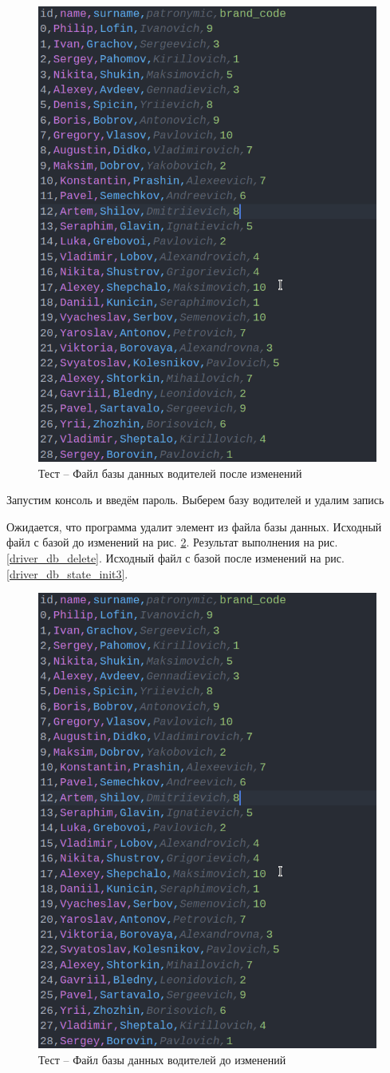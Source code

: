 \begin{figure}[H]
	\centering
	\includegraphics[width=0.7\linewidth]{photo/tests/admin/driver_db_state_edit}
	\caption{Тест -- Файл базы данных водителей после изменений}
	\label{driver_db_state_edit}
\end{figure}

Запустим консоль и введём пароль. 
Выберем базу водителей и удалим запись

Ожидается, что программа удалит элемент из файла базы данных.
Исходный файл с базой до изменений на рис. \ref{driver_db_state_edit2}.
Результат выполнения на рис. \ref{driver_db_delete}.
Исходный файл с базой после изменений на рис. \ref{driver_db_state_init3}.

\begin{figure}[H]
	\centering
	\includegraphics[width=0.7\linewidth]{photo/tests/admin/driver_db_state_edit}
	\caption{Тест -- Файл базы данных водителей до изменений}
	\label{driver_db_state_edit2}
\end{figure}

